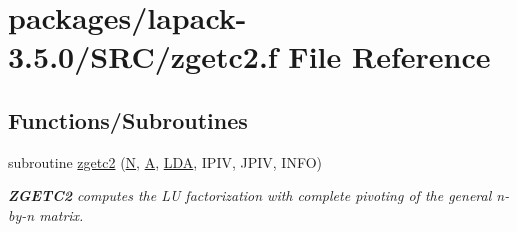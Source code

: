 \hypertarget{zgetc2_8f}{}\section{packages/lapack-\/3.5.0/\+S\+R\+C/zgetc2.f File Reference}
\label{zgetc2_8f}
\subsection*{Functions/\+Subroutines}
\begin{DoxyCompactItemize}
\item 
subroutine \hyperlink{group__complex16GEauxiliary_gae5d1dc8c626b248e836d865f428aa399}{zgetc2} (\hyperlink{polmisc_8c_a0240ac851181b84ac374872dc5434ee4}{N}, \hyperlink{classA}{A}, \hyperlink{example__user_8c_ae946da542ce0db94dced19b2ecefd1aa}{L\+D\+A}, I\+P\+I\+V, J\+P\+I\+V, I\+N\+F\+O)
\begin{DoxyCompactList}\small\item\em {\bfseries Z\+G\+E\+T\+C2} computes the L\+U factorization with complete pivoting of the general n-\/by-\/n matrix. \end{DoxyCompactList}\end{DoxyCompactItemize}
